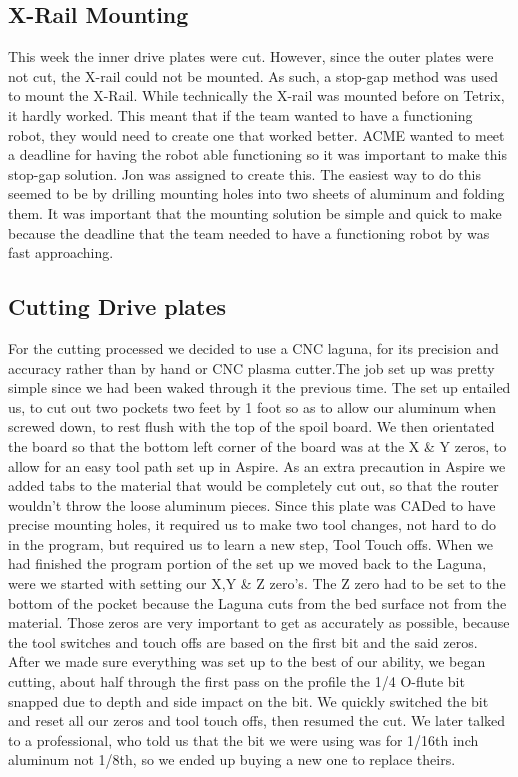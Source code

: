 \documentclass{article}
\begin{document}
\subsection{X-Rail Mounting}
This week the inner drive plates were cut. However, since the outer plates were not cut, the X-rail could not be mounted. As such, a stop-gap method was used to mount the X-Rail. While technically the X-rail was mounted before on Tetrix, it hardly worked. This meant that if the team wanted to have a functioning robot, they would need to create one that worked better. ACME wanted to meet a deadline for having the robot able functioning so it was important to make this stop-gap solution. Jon was assigned to create this. The easiest way to do this seemed to be by drilling mounting holes into two sheets of aluminum and folding them. It was important that the mounting solution be simple and quick to make because the deadline that the team needed to have a functioning robot by was fast approaching. 

\subsection{Cutting Drive plates}
For the cutting processed we decided to use a CNC laguna, for its precision and accuracy rather than by hand or CNC plasma cutter.The job set up was pretty simple since we had been waked through it the previous time. The set up entailed us, to cut out two pockets two feet by 1 foot so as to allow our aluminum when screwed down, to rest flush with the top of the spoil board. We then orientated the board so that the bottom left corner of the board was at the X \& Y zeros, to allow for an easy tool path set up in Aspire. As an extra precaution in Aspire we added tabs to the material that would be completely cut out, so that the router wouldn't throw the loose aluminum pieces. Since this plate was CADed to have precise mounting holes, it required us to make two tool changes, not hard to do in the program, but required us to learn a new step, Tool Touch offs. When we had finished the program portion of the set up we moved back to the Laguna, were we started with setting our X,Y \& Z zero's. The Z zero had to be set to the bottom of the pocket because the Laguna cuts from the bed surface not from the material. Those zeros are very important to get as accurately as possible, because the tool switches and touch offs are based on the first bit and the said zeros. After we made sure everything was set up to the best of our ability, we began cutting, about half through the first pass on the profile the 1/4 O-flute bit snapped due to depth and side impact on the bit. We quickly switched the bit and reset all our zeros and tool touch offs, then resumed the cut. We later talked to a professional, who told us that the bit we were using was for 1/16th inch aluminum not 1/8th, so we ended up buying a new one to replace theirs.  
\end{document}
